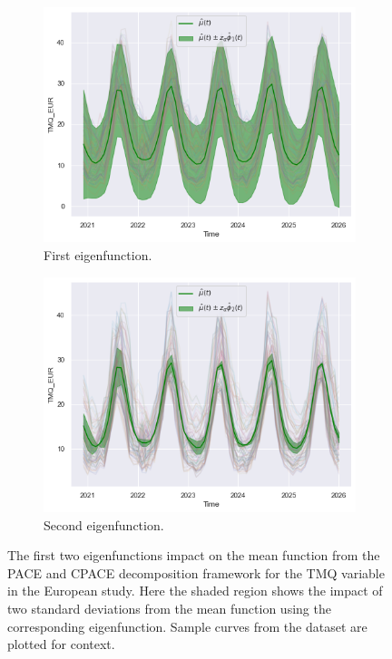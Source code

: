 \begin{figure}
	\centering
	\begin{subfigure}[b]{0.45\textwidth}
		\includegraphics[width=\textwidth]{phi_1_tmq_eur}
		\caption{First eigenfunction.}
		\label{fig:phi_1_tmq_eur}
	\end{subfigure}
	\hfill        
	\begin{subfigure}[b]{0.45\textwidth}
		\includegraphics[width=\textwidth]{phi_2_tmq_eur}
		\caption{Second eigenfunction.}
		\label{fig:phi_2_tmq_eur}
	\end{subfigure}
	\caption[The first two eigenfunctions impact on the mean function from the PACE and CPACE decomposition framework for the TMQ variable in the European study.]{The first two eigenfunctions impact on the mean function from the PACE and CPACE decomposition framework for the TMQ variable in the European study. Here the shaded region shows the impact of two standard deviations from the mean function using the corresponding eigenfunction. Sample curves from the dataset are plotted for context.}
	\label{fig:phi_tmq_eur}
\end{figure}

